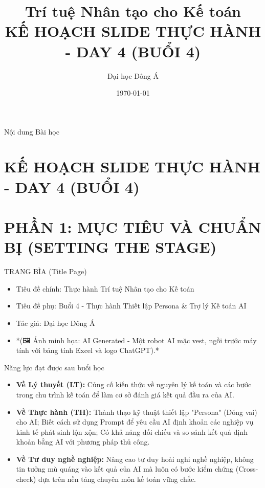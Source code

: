 \documentclass[aspectratio=169]{beamer}
\title[Trí tuệ Nhân tạo cho Kế toán]{Trí tuệ Nhân tạo cho Kế toán \\ \vspace{0.3cm} \Large KẾ HOẠCH SLIDE THỰC HÀNH - DAY 4 (BUỔI 4)}
\author{Đại học Đông Á}
\date{\today}
\begin{document}
\begin{frame}
    \titlepage
\end{frame}

\begin{frame}{Nội dung Bài học}
    \tableofcontents
\end{frame}


\section{KẾ HOẠCH SLIDE THỰC HÀNH - DAY 4 (BUỔI 4)}


\section{PHẦN 1: MỤC TIÊU VÀ CHUẨN BỊ (SETTING THE STAGE)}


\begin{frame}{TRANG BÌA (Title Page)}
    \begin{itemize}
        \item Tiêu đề chính: Thực hành Trí tuệ Nhân tạo cho Kế toán
        \item Tiêu đề phụ: Buổi 4 - Thực hành Thiết lập Persona \& Trợ lý Kế toán AI
        \item Tác giả: Đại học Đông Á
        \item *(🖼️ Ảnh minh họa: AI Generated - Một robot AI mặc vest, ngồi trước máy tính với bảng tính Excel và logo ChatGPT).*
    \end{itemize}
\end{frame}


\begin{frame}{Năng lực đạt được sau buổi học}
    \begin{itemize}
        \item \textbf{Về Lý thuyết (LT):} Củng cố kiến thức về nguyên lý kế toán và các bước trong chu trình kế toán để làm cơ sở đánh giá kết quả đầu ra của AI.
        \item \textbf{Về Thực hành (TH):} Thành thạo kỹ thuật thiết lập "Persona" (Đóng vai) cho AI; Biết cách sử dụng Prompt để yêu cầu AI định khoản các nghiệp vụ kinh tế phát sinh lộn xộn; Có khả năng đối chiếu và so sánh kết quả định khoản bằng AI với phương pháp thủ công.
        \item \textbf{Về Tư duy nghề nghiệp:} Nâng cao tư duy hoài nghi nghề nghiệp, không tin tưởng mù quáng vào kết quả của AI mà luôn có bước kiểm chứng (Cross-check) dựa trên nền tảng chuyên môn kế toán vững chắc.
    \end{itemize}
\end{frame}
\end{document}
